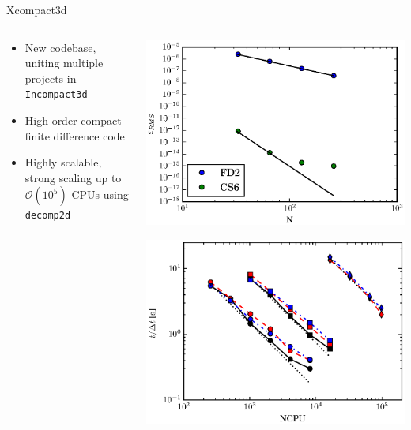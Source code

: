 \documentclass[presentation]{beamer}
\begin{document}
\begin{frame}[label={sec:org0705b60},fragile]{Xcompact3d}
 \begin{columns}
\begin{column}{0.5\columnwidth}
\begin{itemize}
\item New codebase, uniting multiple projects in \texttt{Incompact3d}
\item High-order compact finite difference code
\item Highly scalable, strong scaling up to \(\mathcal{O}\left(10^{5}\right)\) CPUs using \texttt{decomp2d}
\end{itemize}
\end{column}

\begin{column}{0.5\columnwidth}
\begin{center}
\includegraphics[width=0.8\columnwidth]{./figures/convergence-tgv2d.eps}
\end{center}

\begin{center}
\includegraphics[width=0.8\columnwidth]{./figures/x3d-scaling.eps}
\end{center}
\end{column}
\end{columns}
\end{frame}
\end{document}
